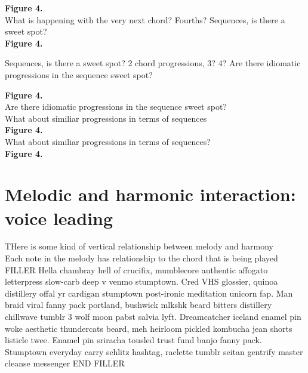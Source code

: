 \documentclass[11pt]{article}
\begin{document}
\noindent
\textbf{Figure 4.}
\\\vspace{5mm} 
\noindent
What is happening with the very next chord? Fourths? Sequences, is there a sweet spot?
\\

\noindent
\textbf{Figure 4.}
\\\vspace{5mm} 
\noindent

Sequences, is there a sweet spot? 2 chord progressions, 3? 4?
Are there idiomatic progressions in the sequence sweet spot?

\noindent
\textbf{Figure 4.}
\\\vspace{5mm} 
\noindent
Are there idiomatic progressions in the sequence sweet spot?
\\

\noindent
What about similiar progressions in terms of sequences
\\

\noindent
\textbf{Figure 4.}
\\\vspace{5mm} 
\noindent
What about similiar progressions in terms of sequences?
\\

\noindent
\textbf{Figure 4.}
\\\noindent
\section{Melodic and harmonic interaction: voice leading}

\noindent
THere is some kind of vertical relationship between melody and harmony
\\

\noindent
Each note in the melody has relationship to the chord that is being played 
FILLER Hella chambray hell of crucifix, mumblecore authentic affogato letterpress slow-carb deep v venmo stumptown. Cred VHS glossier, quinoa distillery offal yr cardigan stumptown post-ironic meditation unicorn fap. Man braid viral fanny pack portland, bushwick mlkshk beard bitters distillery chillwave tumblr 3 wolf moon pabst salvia lyft. Dreamcatcher iceland enamel pin woke aesthetic thundercats beard, meh heirloom pickled kombucha jean shorts listicle twee. Enamel pin sriracha tousled trust fund banjo fanny pack. Stumptown everyday carry schlitz hashtag, raclette tumblr seitan gentrify master cleanse messenger END FILLER
\\
\end{document}
